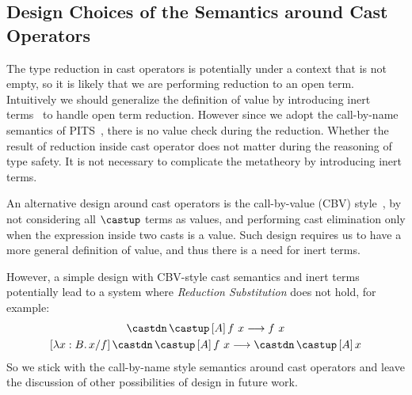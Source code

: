 \begin{comment}
\begin{equation*}
    F : [[int]] \rightarrow [[*]],\, A : [[*]],\, \rulehl{a : A} \vdash F ~ ([[(bind x : A. lambda y : int. y)]]~ 42) : [[*]]
\end{equation*}

For the time being, we think the addition of the premise in \rref{s-forall-r} and
the addition of \rref{s-forall} do not complicate the metatheory as much, so
we leave the further exploration of the issue above in future work.
\end{comment}

\subsection{Design Choices of the Semantics around Cast Operators}
\label{sec:cast-design}

The type reduction in cast operators is potentially under a context that
is not empty, so it is likely that we are performing reduction to an open term.
Intuitively we should generalize the definition of value by introducing inert
terms~\cite{yang2017unifying} to handle open term reduction.
However since we adopt the call-by-name semantics of PITS~\cite{yang2019pure},
there is no value check during the reduction. Whether the result of reduction
inside cast operator does not matter during the reasoning of type safety. It is
not necessary to complicate the metatheory by introducing inert terms.

An alternative design
around cast operators is the call-by-value (CBV) style~\cite{yang2019pure},
by not considering all $\castup$ terms as values, and performing cast elimination only
when the expression inside two casts is a value. Such design requires us to
have a more general definition of value, and thus there is a need for inert terms.

However, a simple design with CBV-style cast semantics and inert terms
potentially lead to a system where \emph{Reduction Substitution} does not hold,
for example:
\begin{gather*}
    \castdn \, \castup \, [A] \, f ~ x \longrightarrow f ~ x \\
    [\lambda x : B. \, x / f] \, \castdn \, \castup \, [A] \, f ~ x \longrightarrow \castdn \, \castup \, [A] \, x
\end{gather*}
So we stick with the call-by-name style semantics around cast operators and
leave the discussion of other possibilities of design in future work.

